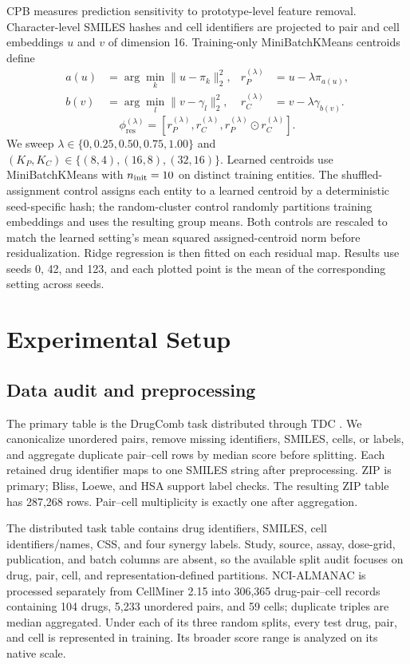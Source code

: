 \documentclass[conference]{IEEEtran}
\begin{document}
CPB measures prediction sensitivity to prototype-level feature removal. Character-level SMILES hashes and cell identifiers are projected to pair and cell embeddings $u$ and $v$ of dimension 16. Training-only MiniBatchKMeans centroids define
\begin{align}
a(u)&=\arg\min_k\|u-\pi_k\|_2^2, &
r_P^{(\lambda)}&=u-\lambda\pi_{a(u)},\\
b(v)&=\arg\min_l\|v-\gamma_l\|_2^2, &
r_C^{(\lambda)}&=v-\lambda\gamma_{b(v)}.
\end{align}
\begin{equation}
\phi_{\mathrm{res}}^{(\lambda)}
=[r_P^{(\lambda)},r_C^{(\lambda)},
r_P^{(\lambda)}\odot r_C^{(\lambda)}].
\label{eq:residual-map}
\end{equation}
We sweep $\lambda\in\{0,0.25,0.50,0.75,1.00\}$ and $(K_P,K_C)\in\{(8,4),(16,8),(32,16)\}$. Learned centroids use MiniBatchKMeans with $n_{\rm init}=10$ on distinct training entities. The shuffled-assignment control assigns each entity to a learned centroid by a deterministic seed-specific hash; the random-cluster control randomly partitions training embeddings and uses the resulting group means. Both controls are rescaled to match the learned setting's mean squared assigned-centroid norm before residualization. Ridge regression is then fitted on each residual map. Results use seeds 0, 42, and 123, and each plotted point is the mean of the corresponding setting across seeds.

\section{Experimental Setup}

\subsection{Data audit and preprocessing}

The primary table is the DrugComb task distributed through TDC \cite{tdc2021}. We canonicalize unordered pairs, remove missing identifiers, SMILES, cells, or labels, and aggregate duplicate pair--cell rows by median score before splitting. Each retained drug identifier maps to one SMILES string after preprocessing. ZIP is primary; Bliss, Loewe, and HSA support label checks. The resulting ZIP table has 287,268 rows. Pair--cell multiplicity is exactly one after aggregation.

The distributed task table contains drug identifiers, SMILES, cell identifiers/names, CSS, and four synergy labels. Study, source, assay, dose-grid, publication, and batch columns are absent, so the available split audit focuses on drug, pair, cell, and representation-defined partitions. NCI-ALMANAC is processed separately from CellMiner 2.15 into 306,365 drug-pair--cell records containing 104 drugs, 5,233 unordered pairs, and 59 cells; duplicate triples are median aggregated. Under each of its three random splits, every test drug, pair, and cell is represented in training. Its broader score range is analyzed on its native scale.
\end{document}
